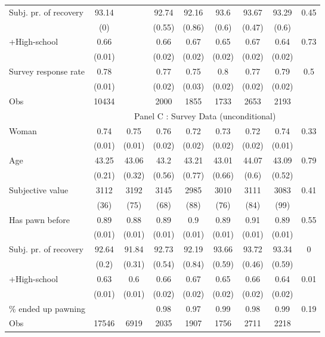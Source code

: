 \begin{tabular}{lcccccccc}
Subj. pr. of recovery & 93.14 &       & 92.74 & 92.16 & 93.6  & 93.67 & 93.29 & 0.45 \\
      & (0)   &       & (0.55) & (0.86) & (0.6) & (0.47) & (0.6) &  \\
+High-school & 0.66  &       & 0.66  & 0.67  & 0.65  & 0.67  & 0.64  & 0.73 \\
      & (0.01) &       & (0.02) & (0.02) & (0.02) & (0.02) & (0.02) &  \\
Survey response rate & 0.78  &       & 0.77  & 0.75  & 0.8   & 0.77  & 0.79  & 0.5 \\
      & (0.01) &       & (0.02) & (0.03) & (0.02) & (0.02) & (0.02) &  \\
\midrule
Obs   & 10434 &       & 2000  & 1855  & 1733  & 2653  & 2193  &  \\
\midrule
\midrule
      & \multicolumn{8}{c}{Panel C : Survey Data (unconditional)} \\
\midrule
\midrule
Woman & 0.74  & 0.75  & 0.76  & 0.72  & 0.73  & 0.72  & 0.74  & 0.33 \\
      & (0.01) & (0.01) & (0.02) & (0.02) & (0.02) & (0.02) & (0.01) &  \\
Age   & 43.25 & 43.06 & 43.2  & 43.21 & 43.01 & 44.07 & 43.09 & 0.79 \\
      & (0.21) & (0.32) & (0.56) & (0.77) & (0.66) & (0.6) & (0.52) &  \\
Subjective value & 3112  & 3192  & 3145  & 2985  & 3010  & 3111  & 3083  & 0.41 \\
      & (36)  & (75)  & (68)  & (88)  & (76)  & (84)  & (99)  &  \\
Has pawn before & 0.89  & 0.88  & 0.89  & 0.9   & 0.89  & 0.91  & 0.89  & 0.55 \\
      & (0.01) & (0.01) & (0.01) & (0.01) & (0.01) & (0.01) & (0.01) &  \\
Subj. pr. of recovery & 92.64 & 91.84 & 92.73 & 92.19 & 93.66 & 93.72 & 93.34 & 0 \\
      & (0.2) & (0.31) & (0.54) & (0.84) & (0.59) & (0.46) & (0.59) &  \\
+High-school & 0.63  & 0.6   & 0.66  & 0.67  & 0.65  & 0.66  & 0.64  & 0.01 \\
      & (0.01) & (0.01) & (0.02) & (0.02) & (0.02) & (0.02) & (0.02) &  \\
\% ended up pawning &       &       & 0.98  & 0.97  & 0.99  & 0.98  & 0.99  & 0.19 \\
\midrule
Obs   & 17546 & 6919  & 2035  & 1907  & 1756  & 2711  & 2218  &  \\
\bottomrule
\bottomrule
\end{tabular}%
